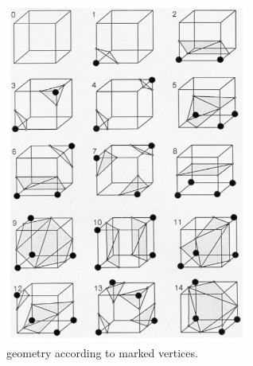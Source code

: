 \documentclass{ACGSeminar}
\begin{document}
\\
\begin{figure}[b!] 
  \begin{centering}
    \includegraphics[width=8cm]{figures/marching_cubes.png}\par 
  \end{centering}
  \caption{geometry according to marked vertices. \cite{Lorensen}}
  \label{fig:surf}
\end{figure}
\end{document}
